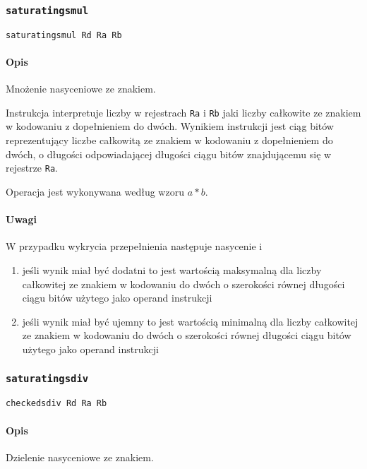 \subsubsection{\texttt{saturatingsmul}}

\begin{lstlisting}
saturatingsmul Rd Ra Rb
\end{lstlisting}

\paragraph*{Opis} Mnożenie nasyceniowe ze znakiem.

Instrukcja interpretuje liczby w rejestrach \texttt{Ra} i \texttt{Rb} jaki
liczby całkowite ze znakiem w kodowaniu z dopełnieniem do dwóch. Wynikiem
instrukcji jest ciąg bitów reprezentujący liczbe całkowitą ze znakiem w
kodowaniu z dopełnieniem do dwóch, o długości odpowiadającej długości ciągu
bitów znajdującemu się w rejestrze \texttt{Ra}.

Operacja jest wykonywana według wzoru $a * b$.

\paragraph*{Uwagi}

W przypadku wykrycia przepełnienia następuje nasycenie i
\begin{enumerate}
\item jeśli wynik miał być dodatni to jest wartością maksymalną dla liczby
    całkowitej ze znakiem w kodowaniu do dwóch o szerokości równej długości
    ciągu bitów użytego jako operand instrukcji
\item jeśli wynik miał być ujemny to jest wartością minimalną dla liczby
    całkowitej ze znakiem w kodowaniu do dwóch o szerokości równej długości
    ciągu bitów użytego jako operand instrukcji
\end{enumerate}

\subsubsection{\texttt{saturatingsdiv}}

\begin{lstlisting}
checkedsdiv Rd Ra Rb
\end{lstlisting}

\paragraph*{Opis} Dzielenie nasyceniowe ze znakiem.

